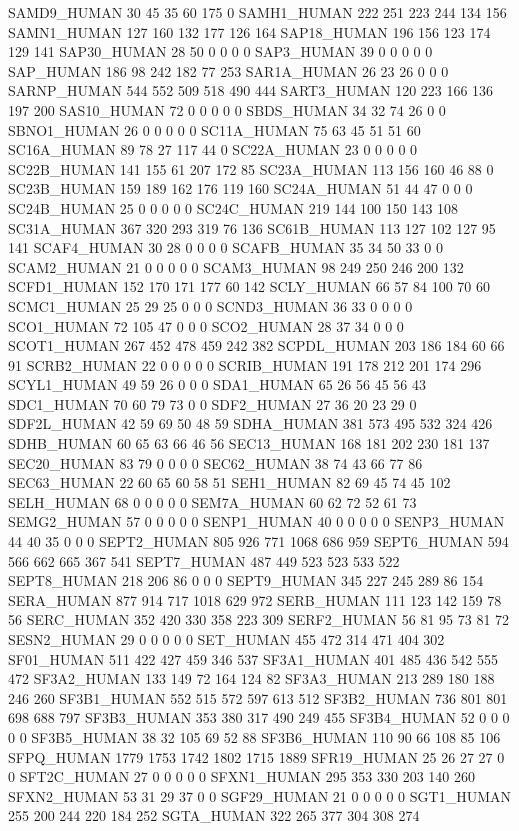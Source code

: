 SAMD9_HUMAN	30	45	35	60	175	0
SAMH1_HUMAN	222	251	223	244	134	156
SAMN1_HUMAN	127	160	132	177	126	164
SAP18_HUMAN	196	156	123	174	129	141
SAP30_HUMAN	28	50	0	0	0	0
SAP3_HUMAN	39	0	0	0	0	0
SAP_HUMAN	186	98	242	182	77	253
SAR1A_HUMAN	26	23	26	0	0	0
SARNP_HUMAN	544	552	509	518	490	444
SART3_HUMAN	120	223	166	136	197	200
SAS10_HUMAN	72	0	0	0	0	0
SBDS_HUMAN	34	32	74	26	0	0
SBNO1_HUMAN	26	0	0	0	0	0
SC11A_HUMAN	75	63	45	51	51	60
SC16A_HUMAN	89	78	27	117	44	0
SC22A_HUMAN	23	0	0	0	0	0
SC22B_HUMAN	141	155	61	207	172	85
SC23A_HUMAN	113	156	160	46	88	0
SC23B_HUMAN	159	189	162	176	119	160
SC24A_HUMAN	51	44	47	0	0	0
SC24B_HUMAN	25	0	0	0	0	0
SC24C_HUMAN	219	144	100	150	143	108
SC31A_HUMAN	367	320	293	319	76	136
SC61B_HUMAN	113	127	102	127	95	141
SCAF4_HUMAN	30	28	0	0	0	0
SCAFB_HUMAN	35	34	50	33	0	0
SCAM2_HUMAN	21	0	0	0	0	0
SCAM3_HUMAN	98	249	250	246	200	132
SCFD1_HUMAN	152	170	171	177	60	142
SCLY_HUMAN	66	57	84	100	70	60
SCMC1_HUMAN	25	29	25	0	0	0
SCND3_HUMAN	36	33	0	0	0	0
SCO1_HUMAN	72	105	47	0	0	0
SCO2_HUMAN	28	37	34	0	0	0
SCOT1_HUMAN	267	452	478	459	242	382
SCPDL_HUMAN	203	186	184	60	66	91
SCRB2_HUMAN	22	0	0	0	0	0
SCRIB_HUMAN	191	178	212	201	174	296
SCYL1_HUMAN	49	59	26	0	0	0
SDA1_HUMAN	65	26	56	45	56	43
SDC1_HUMAN	70	60	79	73	0	0
SDF2_HUMAN	27	36	20	23	29	0
SDF2L_HUMAN	42	59	69	50	48	59
SDHA_HUMAN	381	573	495	532	324	426
SDHB_HUMAN	60	65	63	66	46	56
SEC13_HUMAN	168	181	202	230	181	137
SEC20_HUMAN	83	79	0	0	0	0
SEC62_HUMAN	38	74	43	66	77	86
SEC63_HUMAN	22	60	65	60	58	51
SEH1_HUMAN	82	69	45	74	45	102
SELH_HUMAN	68	0	0	0	0	0
SEM7A_HUMAN	60	62	72	52	61	73
SEMG2_HUMAN	57	0	0	0	0	0
SENP1_HUMAN	40	0	0	0	0	0
SENP3_HUMAN	44	40	35	0	0	0
SEPT2_HUMAN	805	926	771	1068	686	959
SEPT6_HUMAN	594	566	662	665	367	541
SEPT7_HUMAN	487	449	523	523	533	522
SEPT8_HUMAN	218	206	86	0	0	0
SEPT9_HUMAN	345	227	245	289	86	154
SERA_HUMAN	877	914	717	1018	629	972
SERB_HUMAN	111	123	142	159	78	56
SERC_HUMAN	352	420	330	358	223	309
SERF2_HUMAN	56	81	95	73	81	72
SESN2_HUMAN	29	0	0	0	0	0
SET_HUMAN	455	472	314	471	404	302
SF01_HUMAN	511	422	427	459	346	537
SF3A1_HUMAN	401	485	436	542	555	472
SF3A2_HUMAN	133	149	72	164	124	82
SF3A3_HUMAN	213	289	180	188	246	260
SF3B1_HUMAN	552	515	572	597	613	512
SF3B2_HUMAN	736	801	801	698	688	797
SF3B3_HUMAN	353	380	317	490	249	455
SF3B4_HUMAN	52	0	0	0	0	0
SF3B5_HUMAN	38	32	105	69	52	88
SF3B6_HUMAN	110	90	66	108	85	106
SFPQ_HUMAN	1779	1753	1742	1802	1715	1889
SFR19_HUMAN	25	26	27	27	0	0
SFT2C_HUMAN	27	0	0	0	0	0
SFXN1_HUMAN	295	353	330	203	140	260
SFXN2_HUMAN	53	31	29	37	0	0
SGF29_HUMAN	21	0	0	0	0	0
SGT1_HUMAN	255	200	244	220	184	252
SGTA_HUMAN	322	265	377	304	308	274
